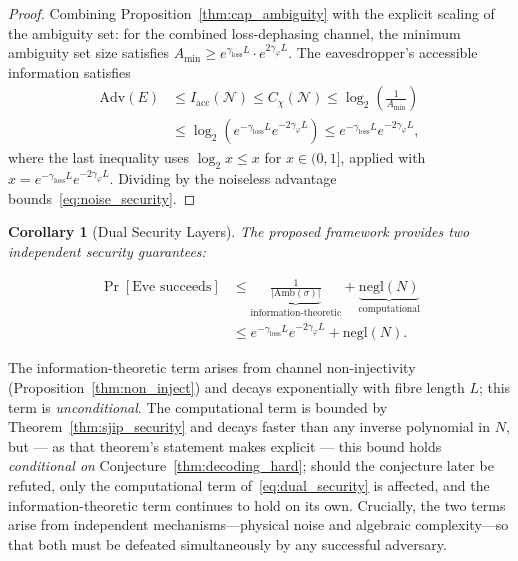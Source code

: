 \documentclass[journal,twocolumn]{IEEEtran}
\theoremstyle{definition}
\theoremstyle{plain}
\newtheorem{corollary}[theorem]{Corollary}
\newcommand{\Amb}{\mathrm{Amb}}
\begin{document}
\begin{proof}
Combining Proposition~\ref{thm:cap_ambiguity} with the explicit scaling
of the ambiguity set: for the combined loss-dephasing channel, the
minimum ambiguity set size satisfies $A_{\min} \ge
e^{\gamma_{\mathrm{loss}}L} \cdot e^{2\gamma_\varphi L}$.
The eavesdropper's accessible information satisfies
\begin{align}
  \mathrm{Adv}(E) &\le I_{\mathrm{acc}}(\mathcal{N})
  \le C_\chi(\mathcal{N})
  \le \log_2\!\left(\frac{1}{A_{\min}}\right) \nonumber\\
  &\le \log_2\!\left(e^{-\gamma_{\mathrm{loss}}L}
    e^{-2\gamma_\varphi L}\right)
  \le e^{-\gamma_{\mathrm{loss}}L} e^{-2\gamma_\varphi L},
  \label{eq:noise_adv_proof}
\end{align}
where the last inequality uses $\log_2 x \le x$ for
$x \in (0,1]$, applied with $x = e^{-\gamma_{\mathrm{loss}}L}
e^{-2\gamma_\varphi L}$.  Dividing by the noiseless advantage
bounds~\eqref{eq:noise_security}.
\end{proof}

\begin{corollary}[Dual Security Layers]
\label{cor:dual_security}
The proposed framework provides two independent security guarantees:

\begin{equation}
\begin{split}
  \Pr[\text{Eve succeeds}] &\le
  \underbrace{\frac{1}{|\Amb(\sigma)|}}_{\text{information-theoretic}}
  + \underbrace{\mathrm{negl}(N)}_{\text{computational}}
  \\&\le e^{-\gamma_{\mathrm{loss}}L} e^{-2\gamma_\varphi L}
  + \mathrm{negl}(N).
  \label{eq:dual_security}
\end{split}
\end{equation}
\end{corollary}

The information-theoretic term arises from channel non-injectivity
(Proposition~\ref{thm:non_inject}) and decays exponentially with fibre
length $L$; this term is \emph{unconditional}. The computational term
is bounded by Theorem~\ref{thm:sjip_security} and decays faster than
any inverse polynomial in $N$, but --- as that theorem's statement
makes explicit --- this bound holds \emph{conditional on}
Conjecture~\ref{thm:decoding_hard}; should the conjecture later be
refuted, only the computational term of~\eqref{eq:dual_security} is
affected, and the information-theoretic term continues to hold on
its own. Crucially, the two terms arise from independent
mechanisms---physical noise and algebraic complexity---so that both
must be defeated simultaneously by any successful adversary.
\end{document}
